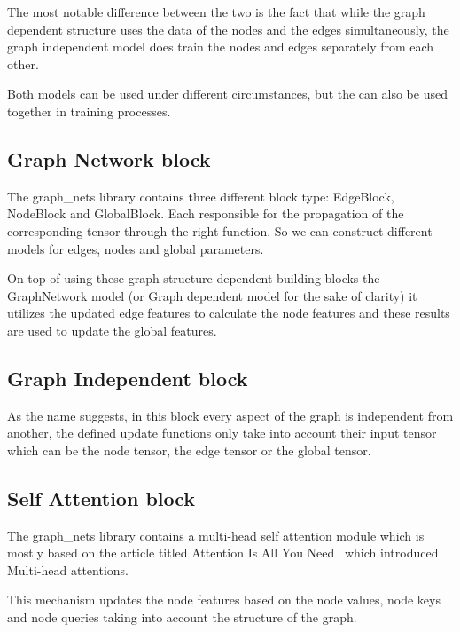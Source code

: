 The most notable difference between the two is the fact that while the graph dependent structure uses the data of the nodes and the edges simultaneously, the graph independent model does train the nodes and edges separately from each other.

Both models can be used under different circumstances, but the can also be used together in training processes.

\subsection{Graph Network block}
The graph\_nets library contains three different block type: EdgeBlock, NodeBlock and GlobalBlock. Each responsible for the propagation of the corresponding tensor through the right function. So we can construct different models for edges, nodes and global parameters.


On top of using these graph structure dependent building blocks the GraphNetwork model (or Graph dependent model for the sake of clarity) it utilizes the updated edge features to calculate the node features and these results are used to update the global features.

\subsection{Graph Independent block}
As the name suggests, in this block every aspect of the graph is independent from another, the defined update functions only take into account their input tensor which can be the node tensor, the edge tensor or the global tensor.

\subsection{Self Attention block}
The graph\_nets library contains a multi-head self attention module which is mostly based on the article titled Attention Is All You Need~\cite{Multihead} which introduced Multi-head attentions.

This mechanism updates the node features based on the node values, node keys and node queries taking into account the structure of the graph.
